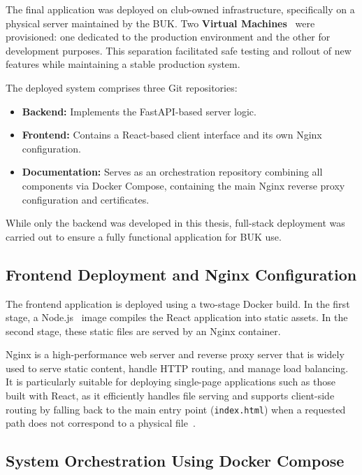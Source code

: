 The final application was deployed on club-owned infrastructure, specifically on a physical server maintained by the BUK. Two \textbf{Virtual Machines}~\cite{VM} were provisioned: one dedicated to the production environment and the other for development purposes. This separation facilitated safe testing and rollout of new features while maintaining a stable production system.

The deployed system comprises three Git repositories:
\begin{itemize}
    \item \textbf{Backend:} Implements the FastAPI-based server logic.
    \item \textbf{Frontend:} Contains a React-based client interface and its own Nginx configuration.
    \item \textbf{Documentation:} Serves as an orchestration repository combining all components via Docker Compose, containing the main Nginx reverse proxy configuration and certificates.
\end{itemize}

While only the backend was developed in this thesis, full-stack deployment was carried out to ensure a fully functional application for BUK use.

\subsection{Frontend Deployment and Nginx Configuration}

The frontend application is deployed using a two-stage Docker build. In the first stage, a Node.js~\cite{Node.js} image compiles the React application into static assets. In the second stage, these static files are served by an Nginx container.

Nginx is a high-performance web server and reverse proxy server that is widely used to serve static content, handle HTTP routing, and manage load balancing. It is particularly suitable for deploying single-page applications such as those built with React, as it efficiently handles file serving and supports client-side routing by falling back to the main entry point (\texttt{index.html}) when a requested path does not correspond to a physical file~\cite{Nginx}.

\subsection{System Orchestration Using Docker Compose}


